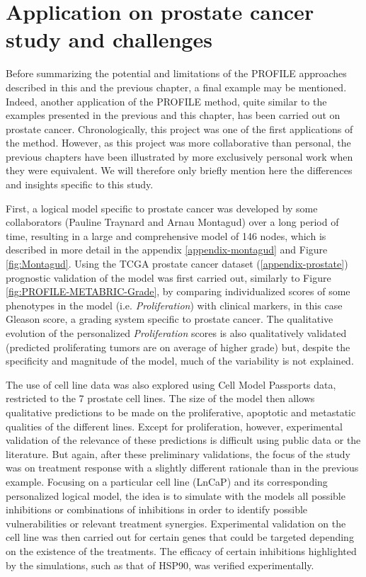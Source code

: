 \documentclass[a4paper,12pt,twoside,onecolumn,openright,final,oldfontcommands]{memoir}
\begin{document}
\section{Application on prostate cancer study and
challenges}\label{prostate-model}

Before summarizing the potential and limitations of the PROFILE
approaches described in this and the previous chapter, a final example
may be mentioned. Indeed, another application of the PROFILE method,
quite similar to the examples presented in the previous and this
chapter, has been carried out on prostate cancer. Chronologically, this
project was one of the first applications of the method. However, as
this project was more collaborative than personal, the previous chapters
have been illustrated by more exclusively personal work when they were
equivalent. We will therefore only briefly mention here the differences
and insights specific to this study.

First, a logical model specific to prostate cancer was developed by some
collaborators (Pauline Traynard and Arnau Montagud) over a long period
of time, resulting in a large and comprehensive model of 146 nodes,
which is described in more detail in the appendix
\ref{appendix-montagud} and Figure \ref{fig:Montagud}. Using the TCGA
prostate cancer dataset (\ref{appendix-prostate}) prognostic validation
of the model was first carried out, similarly to Figure
\ref{fig:PROFILE-METABRIC-Grade}, by comparing individualized scores of
some phenotypes in the model (i.e. \emph{Proliferation}) with clinical
markers, in this case Gleason score, a grading system specific to
prostate cancer. The qualitative evolution of the personalized
\emph{Proliferation} scores is also qualitatively validated (predicted
proliferating tumors are on average of higher grade) but, despite the
specificity and magnitude of the model, much of the variability is not
explained.

The use of cell line data was also explored using Cell Model Passports
data, restricted to the 7 prostate cell lines. The size of the model
then allows qualitative predictions to be made on the proliferative,
apoptotic and metastatic qualities of the different lines. Except for
proliferation, however, experimental validation of the relevance of
these predictions is difficult using public data or the literature. But
again, after these preliminary validations, the focus of the study was
on treatment response with a slightly different rationale than in the
previous example. Focusing on a particular cell line (LnCaP) and its
corresponding personalized logical model, the idea is to simulate with
the models all possible inhibitions or combinations of inhibitions in
order to identify possible vulnerabilities or relevant treatment
synergies. Experimental validation on the cell line was then carried out
for certain genes that could be targeted depending on the existence of
the treatments. The efficacy of certain inhibitions highlighted by the
simulations, such as that of HSP90, was verified experimentally.
\end{document}
